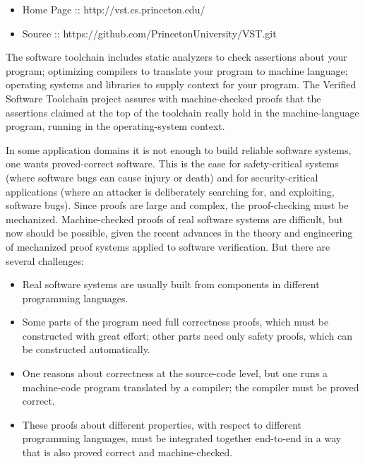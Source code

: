 \documentclass[12pt,twoside]{article}
\begin{document}
\begin{itemize}[noitemsep,topsep=\mdcompacttopsep]%

\item{}Home Page :: http://vst.cs.princeton.edu/%

\item{}Source :: https://github.com/PrincetonUniversity/VST.git%
\end{itemize}%

\noindent{}The software toolchain includes static analyzers to check assertions
about your program; optimizing compilers to translate your program to
machine language; operating systems and libraries to supply context
for your program. The Verified Software Toolchain project assures with
machine-checked proofs that the assertions claimed at the top of the
toolchain really hold in the machine-language program, running in the
operating-system context.%

In some application domains it is not enough to build reliable
software systems, one wants proved-correct software. This is the case
for safety-critical systems (where software bugs can cause injury or
death) and for security-critical applications (where an attacker is
deliberately searching for, and exploiting, software bugs). Since
proofs are large and complex, the proof-checking must be
mechanized. Machine-checked proofs of real software systems are
difficult, but now should be possible, given the recent advances in
the theory and engineering of mechanized proof systems applied to
software verification. But there are several challenges:%

\begin{itemize}%

\item{}
Real software systems are usually built from components in different
programming languages.%

\item{}
Some parts of the program need full correctness proofs, which must
be constructed with great effort; other parts need only safety
proofs, which can be constructed automatically.%

\item{}
One reasons about correctness at the source-code level, but one runs
a machine-code program translated by a compiler; the compiler must
be proved correct.%

\item{}
These proofs about different properties, with respect to different
programming languages, must be integrated together end-to-end in a
way that is also proved correct and machine-checked.%
\end{itemize}%
\end{document}
